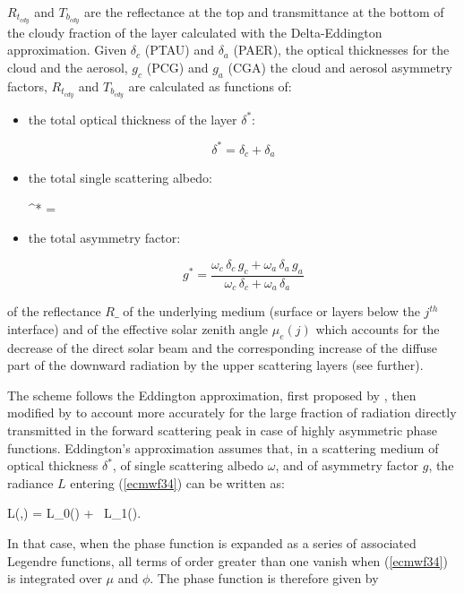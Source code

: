 $R_{t_{cdy}}$ and $T_{b_{cdy}}$ are the reflectance at the top and transmittance
at the bottom of the cloudy fraction of the layer calculated with the
Delta-Eddington approximation. Given $\delta_c$ (PTAU) and $\delta_a$ (PAER), the optical thicknesses for the cloud and the aerosol, $g_c$ (PCG) and $g_a$ (CGA) the cloud and aerosol
asymmetry factors, $R_{t_{cdy}}$ and $T_{b_{cdy}}$ are calculated as functions of:

\begin{itemize}
\item{the total optical thickness of the layer $\delta^{*}$:}

\[
\delta^{*} = \delta_c + \delta_a 
\]

\item{the total single scattering albedo:}

\be
\omega^{*} = 
\label{ecmwf314}
\ee

\item{the total asymmetry factor:}

\[
g^{*} = \frac{\omega_c  \, \delta_c  \,  g_c+ \omega_a  \, \delta_a  \, g_a}
{\omega_c  \, \delta_c+ \omega_a  \, \delta_a}
\]
\end{itemize}


\noindent of the reflectance $R\_$ of the underlying medium (surface or layers
below the $j^{th}$ interface) and of the effective solar zenith angle $\mu_e(j)$
which accounts for the decrease of the direct solar beam and the corresponding
increase of the diffuse part of the downward radiation by the upper scattering
layers (see further).

The scheme follows the Eddington approximation, first proposed by \citet{Shettle1970}, then modified by \citet{Joseph1976} to account more accurately for the large fraction of radiation directly transmitted in the forward scattering peak in case of highly asymmetric phase functions. Eddington's approximation assumes that, in a scattering medium of optical thickness $\delta^{*}$, of single scattering albedo $\omega$, and of asymmetry factor $g$, the radiance $L$ entering (\ref{ecmwf34}) can be written as:

\medskip
\be
L(\delta,\mu) = L_0(\delta) + \mu \, L_1(\delta).
\label{ecmwf317}
\ee
\medskip

In that case, when the phase function is expanded as a series of associated Legendre functions, all terms of order greater than one vanish when (\ref{ecmwf34}) is integrated over $\mu$ and $\phi$. The phase function is therefore given by

